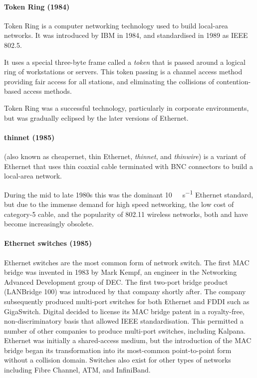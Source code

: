 {\paragraph{Token Ring (1984)}%
Token Ring is a computer networking technology used to build local-area networks.
It was introduced by IBM in 1984, and standardised in 1989 as \acs{IEEE} 802.5.

It uses a special three-byte frame called a \emph{token} that is passed around a logical ring of workstations or servers.
This token passing is a channel access method providing fair access for all stations, and eliminating the collisions of contention-based access methods.

Token Ring was a successful technology, particularly in corporate environments, but was gradually eclipsed by the later versions of Ethernet.

\paragraph{thinnet (1985)}%
 (also known as cheapernet, thin Ethernet, \emph{thinnet}, and \emph{thinwire}) is a variant of Ethernet that uses thin coaxial cable terminated with \acs{BNC} connectors to build a local-area network.

During the mid to late 1980s this was the dominant \SI{10}{\mega\bit\per\second} Ethernet standard, but due to the immense demand for high speed networking, the low cost of \mbox{category-5} cable, and the popularity of 802.11 wireless networks, both  and  have become increasingly obsolete.

\paragraph{Ethernet switches (1985)}%
Ethernet switches are the most common form of network switch.
The first \acs{MAC} bridge was invented in 1983 by Mark Kempf, an engineer in the Networking Advanced Development group of \gls{DEC}.
The first two-port bridge product (LANBridge 100) was introduced by that company shortly after.
The company subsequently produced multi-port switches for both Ethernet and \acs{FDDI} such as GigaSwitch.
Digital decided to license its \acs{MAC} bridge patent in a royalty-free, non-dis\-crim\-i\-na\-tory basis that allowed \acs{IEEE} standardisation.
This permitted a number of other companies to produce multi-port switches, including Kalpana.
Ethernet was initially a shared-access medium, but the introduction of the \acs{MAC} bridge began its transformation into its most-common point-to-point form without a collision domain.
Switches also exist for other types of networks including Fibre Channel, \gls{ATM}, and InfiniBand.
    
}
